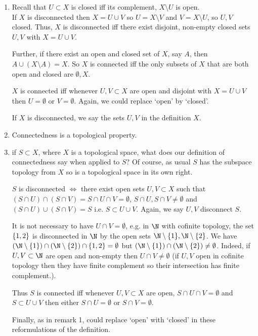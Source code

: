 \begin{remark}
    \begin{enumerate}
        \item Recall that $U\subset X$ is closed iff its complement, $X \setminus U$ is open. \\
        If $X$ is disconnected then $X = U \cup V$ so $U = X \setminus V$ and $V = X \setminus U$, so $U, V$ closed.
        Thus, $X$ is disconnected iff there exist disjoint, non-empty closed sets $U,V$ with $X = U\cup V$.

        Further, if there exist an open and closed set of $X$, say $A$, then $A \cup (X \setminus A) = X$.
        So $X$ is connected iff the only subsets of $X$ that are both open and closed are $\emptyset, X$.

        $X$ is connected iff whenever $U,V\subset X$ are open and disjoint with $X=U\cup V$ then $U=\emptyset$ or $V=\emptyset$. Again, we could replace `open' by `closed'.

        If $X$ is disconnected, we say the sets $U,V$ in the definition  $X$.

        \item Connectedness is a topological property.
        \item if $S\subset X$, where $X$ is a topological space, what does our definition of connectedness say when applied to $S$? Of course, as usual $S$ has the subspace topology from $X$ so is a topological space in its own right.

        $S$ is disconnected $\iff$ there exist open sets $U,V\subset X$ such that $(S \cap U) \cap (S \cap V) = S\cap U\cap V = \emptyset$, $S \cap U, S \cap V \neq \emptyset$ and $(S \cap U) \cup (S \cap V) = S$ i.e. $S\subset U\cup V$. Again, we say $U,V$ disconnect $S$.

        \begin{warning}
            It is not necessary to have $U\cap V =\emptyset$, e.g. in $\N$ with cofinite topology, the set $\{1,2\}$ is disconnected in $\N$ by the open sets $\N\setminus \set{1}, \N\setminus \set{2}$. We have $(\N\setminus \set{1}) \cap (\N\setminus \set{2})\cap \set{1,2} = \emptyset$ but $(\N\setminus \set{1})\cap (\N\setminus \set{2}) \neq \emptyset$. Indeed, if $U,V\subset \N$ are open and non-empty then $U\cap V\neq\emptyset$ (if $U, V$ open in cofinite topology then they have finite complement so their intersection has finite complement.).
        \end{warning}

        Thus $S$ is connected iff whenever $U,V\subset X$ are open, $S\cap U\cap V=\emptyset$ and $S \subset U \cup V$ then either $S\cap U=\emptyset$ or $S\cap V=\emptyset.$

        Finally, as in remark 1, could replace `open' with `closed' in these reformulations of the definition.
    \end{enumerate}
\end{remark}

